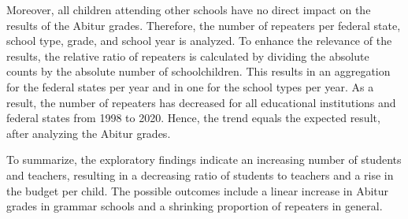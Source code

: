 Moreover, all children attending other schools have no direct impact on the results of the Abitur grades. Therefore, the number of repeaters per federal state, school type, grade, and school year is analyzed. To enhance the relevance of the results, the relative ratio of repeaters is calculated by dividing the absolute counts by the absolute number of schoolchildren. This results in an aggregation for the federal states per year and in one for the school types per year. As a result, the number of repeaters has decreased for all educational institutions and federal states from 1998 to 2020. Hence, the trend equals the expected result, after analyzing the Abitur grades.

To summarize, the exploratory findings indicate an increasing number of students and teachers, resulting in a decreasing ratio of students to teachers and a rise in the budget per child. The possible outcomes include a linear increase in Abitur grades in grammar schools and a shrinking proportion of repeaters in general.
